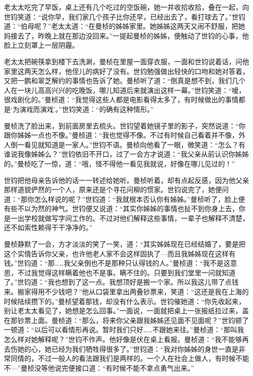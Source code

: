 \par 老太太吃完了早饭，桌上还有几个吃过的空饭碗，她一并收拾收拾，叠在一起，向世钧笑道：“说你早，我们家几个孩子比你还早，已经出去了，看打球去了。”世钧道：“伯母呢？”老太太道：“在曼桢的姊姊家里。她姊姊这两天又闹不舒服，把她妈接去了，昨晚上就在那边没回来。”一提起曼桢的姊姊，便触动了世钧的心事，他脸上立刻罩上一层阴霾。
\par 老太太把碗筷拿到楼下去洗涮，曼桢在里屋一面穿衣服，一面和世钧说着话，问他家里这两天怎么样，他侄儿的病好了没有。世钧勉强做出轻快的口吻和她对答着，又把一鹏和翠芝解约的事情也告诉了她。曼桢听了道：“倒真是想不到，我们几个人在一块儿高高兴兴的吃晚饭，哪儿知道后来就演出这样一幕。”世钧笑道：“嗳，很戏剧化的。”曼桢道：“我觉得这些人都是电影看得太多了，有时候做出的事情都是‘为演戏而演戏’。”世钧笑道：“的确有这种情形。”
\par 曼桢洗了脸出来，到前面房里去梳头。世钧望着她镜子里的影子，突然说道：“你跟你姊姊一点也不像。”曼桢道：“我也觉得不像。不过有时候自己看着并不像，外人倒一看见就知道是一家人。”世钧不语。曼桢向他看了一眼，微笑道：“怎么？有谁说我像姊姊么？”世钧依旧不开口，过了一会方才说道：“我父亲从前认识你姊姊的。”曼桢吃了一惊，道：“哦，怪不得他一看见我就说，好像在哪儿见过的！”
\par 世钧把他母亲告诉他的话一一转述给她听。曼桢听着，却有点起反感，因为他父亲那样道貌俨然的一个人，原来还是个寻花问柳的惯家。世钧说完了，她便问道：“那你怎么样说的呢？”世钧道：“我就根本否认你有姊姊。”曼桢听了，脸上便有些不以为然的神气。世钧便又说道：“其实你姊姊的事情也扯不到你身上去，你是一出学校就做写字间工作的。不过对他们解释这些事情，一辈子也解释不清楚，还不如索性赖得干干净净的。”
\par 曼桢静默了一会，方才淡淡的笑了一笑，道：“其实姊姊现在已经结婚了，要是把这个实情告诉你父亲，也许他老人家不会这样固执了—而且我姊姊现在这样有钱。”世钧道：“那……我父亲倒也不是那种只认得钱的人。”曼桢道：“我不是这意思，不过我觉得这样瞒着他也不是事。瞒不住的。只要到我们堂里一问就知道了。”世钧道：“我也想到了这一点。我想顶好是搬一个家。所以我这儿带了点钱来。搬家得用不少钱吧？”他从口袋里拿出两叠钞票来，笑道：“这还是我在上海的时候陆续攒下的。”曼桢望着那钱，却没有什么表示。世钧催她道：“你先收起来，别让老太太看见了，她想是怎么回事。”一面说，一面就把桌上一张报纸拉过来，盖在那钞票上面。曼桢道：“那么，将来你父亲跟我姊姊还见面不见面呢？”世钧顿了一顿道：“以后可以看情形再说。暂时我们只好……不跟她来往。”曼桢道：“那叫我怎么样对她解释呢？”世钧不作声。他好像是伏在桌上看报。曼桢道：“我不能够再去伤她的心，她已经为我们牺牲得很多了。”世钧道：“我对你姊姊的身世一直是非常同情的，不过一般人的看法跟我们是两样的。一个人在社会上做人，有时候不能不—”曼桢没等他说完便接口道：“有时候不能不拿点勇气出来。”
